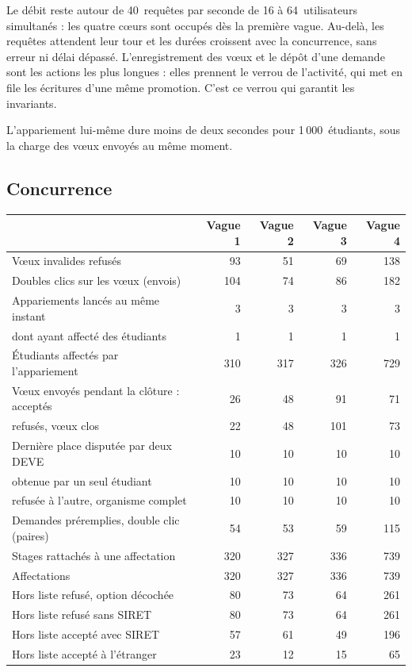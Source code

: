 \documentclass[11pt,a4paper]{article}
\begin{document}
Le débit reste autour de 40~requêtes par seconde de 16 à 64~utilisateurs simultanés : les quatre
cœurs sont occupés dès la première vague. Au-delà, les requêtes attendent leur tour et les durées croissent
avec la concurrence, sans erreur ni délai dépassé. L'enregistrement des vœux et le dépôt d'une
demande sont les actions les plus longues : elles prennent le verrou de l'activité, qui met en
file les écritures d'une même promotion. C'est ce verrou qui garantit les invariants.

L'appariement lui-même dure moins de deux secondes pour 1\,000~étudiants, sous la charge des vœux
envoyés au même moment.

\subsection{Concurrence}

\begin{center}
\begin{tabularx}{\linewidth}{@{}X r r r r@{}}
\toprule
& \textbf{Vague 1} & \textbf{Vague 2} & \textbf{Vague 3} & \textbf{Vague 4} \\
\midrule
Vœux invalides refusés & 93 & 51 & 69 & 138 \\
Doubles clics sur les vœux (envois) & 104 & 74 & 86 & 182 \\
Appariements lancés au même instant & 3 & 3 & 3 & 3 \\
\quad dont ayant affecté des étudiants & 1 & 1 & 1 & 1 \\
Étudiants affectés par l'appariement & 310 & 317 & 326 & 729 \\
Vœux envoyés pendant la clôture : acceptés & 26 & 48 & 91 & 71 \\
\quad refusés, vœux clos & 22 & 48 & 101 & 73 \\
Dernière place disputée par deux DEVE & 10 & 10 & 10 & 10 \\
\quad obtenue par un seul étudiant & 10 & 10 & 10 & 10 \\
\quad refusée à l'autre, organisme complet & 10 & 10 & 10 & 10 \\
Demandes préremplies, double clic (paires) & 54 & 53 & 59 & 115 \\
Stages rattachés à une affectation & 320 & 327 & 336 & 739 \\
Affectations & 320 & 327 & 336 & 739 \\
Hors liste refusé, option décochée & 80 & 73 & 64 & 261 \\
Hors liste refusé sans SIRET & 80 & 73 & 64 & 261 \\
Hors liste accepté avec SIRET & 57 & 61 & 49 & 196 \\
Hors liste accepté à l'étranger & 23 & 12 & 15 & 65 \\
\bottomrule
\end{tabularx}
\end{center}
\end{document}
